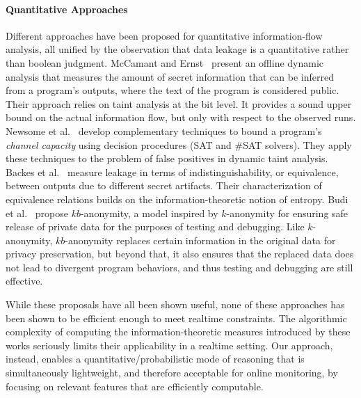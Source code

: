 \paragraph{Quantitative Approaches} Different approaches have been proposed for quantitative information-flow analysis, all unified by the observation that data leakage is a quantitative rather than boolean judgment. McCamant and Ernst~\cite{ME:PLDI08} present an offline dynamic analysis that measures the amount of secret information that can be inferred from a program's outputs, where the text of the program is considered public. Their approach relies on taint analysis at the bit level. It provides a sound upper bound on the actual information flow, but only with respect to the observed runs.
Newsome et al.~\cite{NMS:PLAS09} develop complementary techniques to bound a program's \emph{channel capacity} using decision procedures (SAT and \#SAT solvers). They apply these techniques to the problem of false positives in dynamic taint analysis. Backes et al.~\cite{BKR:SP09} measure leakage in terms of indistinguishability, or equivalence, between outputs due to different secret artifacts. Their characterization of equivalence relations builds on the information-theoretic notion of entropy.
Budi et al.~\cite{BLJL:PLDI11} propose $kb$-anonymity, a model inspired by $k$-anonymity for ensuring safe release of private data for the purposes of testing and debugging. Like $k$-anonymity, $kb$-anonymity replaces certain information in the original data for privacy preservation, but beyond that, it also ensures that the replaced data does not lead to divergent program behaviors, and thus testing and debugging are still effective.

While these proposals have all been shown useful, none of these approaches has been shown to be efficient enough to meet realtime constraints. The algorithmic complexity of computing the information-theoretic measures introduced by these works seriously limits their applicability in a realtime setting. Our approach, instead, enables a quantitative/probabilistic mode of reasoning that is simultaneously lightweight, and therefore acceptable for online monitoring, by focusing on relevant features that are efficiently computable.

